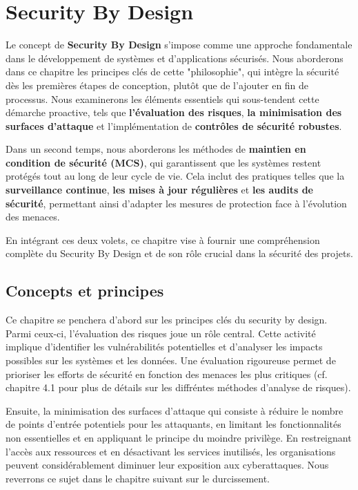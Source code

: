 \section{Security By Design}

Le concept de \textbf{Security By Design} s'impose comme une approche fondamentale dans le développement de systèmes et d'applications sécurisés. Nous aborderons dans ce chapitre les principes clés de cette "philosophie", qui intègre la sécurité dès les premières étapes de conception, plutôt que de l'ajouter en fin de processus. Nous examinerons les éléments essentiels qui sous-tendent cette démarche proactive, tels que \textbf{l'évaluation des risques}, \textbf{la minimisation des surfaces d'attaque} et l'implémentation de \textbf{contrôles de sécurité robustes}.

Dans un second temps, nous aborderons les méthodes de \textbf{maintien en condition de sécurité (MCS)}, qui garantissent que les systèmes restent protégés tout au long de leur cycle de vie. Cela inclut des pratiques telles que la \textbf{surveillance continue}, \textbf{les mises à jour régulières} et \textbf{les audits de sécurité}, permettant ainsi d'adapter les mesures de protection face à l'évolution des menaces. 

En intégrant ces deux volets, ce chapitre vise à fournir une compréhension complète du Security By Design et de son rôle crucial dans la sécurité des projets.

\subsection{Concepts et principes}

Ce chapitre se penchera d'abord sur les principes clés du security by design. Parmi ceux-ci, l'évaluation des risques joue un rôle central. 
Cette activité implique d'identifier les vulnérabilités potentielles et d'analyser les impacts possibles sur les systèmes et les données. Une évaluation rigoureuse permet de prioriser les efforts de sécurité en fonction des menaces les plus critiques (cf. chapitre 4.1 pour plus de détails sur les diffréntes méthodes d'analyse de risques).

Ensuite, la minimisation des surfaces d'attaque qui consiste à réduire le nombre de points d'entrée potentiels pour les attaquants, en limitant les fonctionnalités non essentielles et en appliquant le principe du moindre privilège. En restreignant l'accès aux ressources et en désactivant les services inutilisés, les organisations peuvent considérablement diminuer leur exposition aux cyberattaques. Nous reverrons ce sujet dans le chapitre suivant sur le durcissement.

